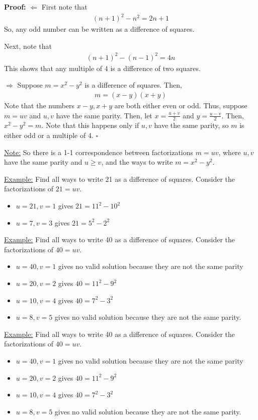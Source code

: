 \documentclass{article}
\newcommand*{\qed}{\hfill$\square$}%
\begin{document}
\textbf{Proof:} $\Leftarrow$ First note that \begin{align*}
	(n+1)^2-n^2=2n+1
\end{align*}So, any odd number can be written as a difference of squares. 

Next, note that \begin{align*}
	(n+1)^2-(n-1)^2=4n
\end{align*}This shows that any multiple of $4$ is a difference of two squares. 

$\Rightarrow$ Suppose $m=x^2-y^2$ is a difference of squares. Then, \begin{align*}
	m=(x-y)(x+y)
\end{align*}Note that the numbers $x-y,x+y$ are both either even or odd.  Thus, suppose $m=uv$ and $u,v$ have the same parity. Then, let $x=\frac{u+v}{2}$ and $y=\frac{u-v}{2}$. Then, $x^2-y^2=m$. Note that this happens only if $u,v$ have the same parity, so $m$ is either odd or a multiple of 4. \qed

\underline{Note:} So there is a 1-1 correspondence between factorizations $m=uv$, where $u,v$ have the same parity and $u\geq v$, and the ways to write $m=x^2-y^2$. 

\underline{Example:} Find all ways to write 21 as a difference of squares. Consider the factorizations of $21=uv$. \begin{itemize}
	\item $u=21,v=1$ gives $21=11^2-10^2$
	\item $u=7,v=3$ gives $21=5^2-2^2$
\end{itemize}

\underline{Example:} Find all ways to write 40 as a difference of squares. Consider the factorizations of $40=uv$. \begin{itemize}
	\item $u=40, v=1$ gives no valid solution because they are not the same parity 
	\item $u=20, v=2$ gives $40=11^2-9^2$
	\item $u=10, v=4$ gives $40=7^2-3^2$
	\item $u=8, v=5$ gives no valid solution because they are not the same parity. 
\end{itemize}

\underline{Example:} Find all ways to write 40 as a difference of squares. Consider the factorizations of $40=uv$. \begin{itemize}
	\item $u=40, v=1$ gives no valid solution because they are not the same parity 
	\item $u=20, v=2$ gives $40=11^2-9^2$
	\item $u=10, v=4$ gives $40=7^2-3^2$
	\item $u=8, v=5$ gives no valid solution because they are not the same parity. 
\end{itemize}
\end{document}
